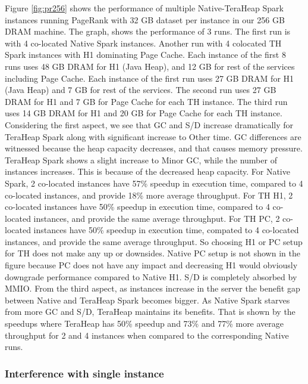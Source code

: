 Figure \ref{fig:pr256} shows the performance of multiple
Native-TeraHeap Spark instances running PageRank with 32 GB
dataset per instance in our 256 GB DRAM machine.
The graph, shows the
performance of 3 runs. The first run is with 4 co-located Native Spark instances.
Another run with 4 colocated TH Spark instances with H1 dominating Page Cache.
Each instance of the first 8 runs uses 48 GB DRAM for H1 (Java Heap), and 12 GB for rest of the services including Page Cache.
Each instance of the first run uses 27 GB DRAM for H1 (Java Heap) and 7 GB for rest of the services.
The second run uses 27 GB DRAM for H1 and 7 GB for Page Cache for each TH instance.
The third run uses 14 GB DRAM for H1 and 20 GB for Page Cache for each TH instance.
Considering the first aspect, we see that GC and S/D increase dramatically for TeraHeap Spark along with significant increase to Other time. GC differences are witnessed because the heap capacity decreases, and that causes memory pressure. TeraHeap Spark shows a slight increase to Minor GC, while the number of instances increases. This is because of the decreased heap capacity. For Native Spark, 2 co-located instances have 57\% speedup in execution time, compared to 4 co-located instances, and provide 18\% more average throughput. For TH H1, 2 co-located instances have 50\% speedup in execution time, compared to 4 co-located instances, and provide the same average throughput. For TH PC, 2 co-located instances have 50\% speedup in execution time, compated to 4 co-located instances, and provide the same average throughput. So choosing H1 or PC setup for TH does not make any up or downsides. Native PC setup is not shown in the figure because PC does not have any impact and decreasing H1 would obviously downgrade performance compared to Native H1.
S/D is completely absorbed by MMIO. From the third aspect, as instances increase in the server the benefit gap between Native and TeraHeap Spark becomes bigger. As Native Spark starves from more GC and S/D, TeraHeap maintains its benefits. That is shown by the speedups where TeraHeap has 50\% speedup and 73\% and 77\% more average throughput for 2 and 4 instances when compared to the corresponding Native runs.
\fi

\subsubsection{Interference with single instance}

